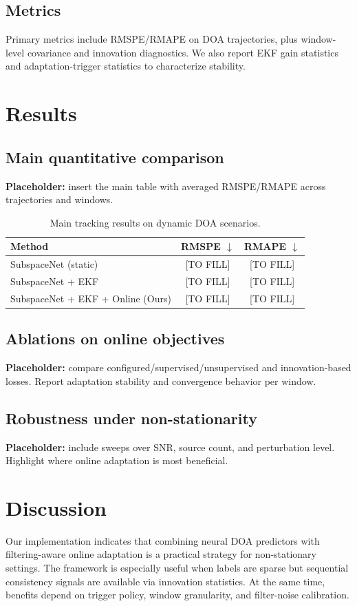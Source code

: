 \documentclass{article}
\begin{document}
\subsection{Metrics}
Primary metrics include RMSPE/RMAPE on DOA trajectories, plus window-level covariance and innovation diagnostics.
We also report EKF gain statistics and adaptation-trigger statistics to characterize stability.

\section{Results}
\subsection{Main quantitative comparison}
\textbf{Placeholder:} insert the main table with averaged RMSPE/RMAPE across trajectories and windows.

\begin{table}[t]
\caption{Main tracking results on dynamic DOA scenarios.}
\label{tab:main}
\centering
\begin{tabular}{lcc}
\toprule
Method & RMSPE $\downarrow$ & RMAPE $\downarrow$ \\
\midrule
SubspaceNet (static) & [TO FILL] & [TO FILL] \\
SubspaceNet + EKF & [TO FILL] & [TO FILL] \\
SubspaceNet + EKF + Online (Ours) & [TO FILL] & [TO FILL] \\
\bottomrule
\end{tabular}
\end{table}

\subsection{Ablations on online objectives}
\textbf{Placeholder:} compare configured/supervised/unsupervised and innovation-based losses.
Report adaptation stability and convergence behavior per window.

\subsection{Robustness under non-stationarity}
\textbf{Placeholder:} include sweeps over SNR, source count, and perturbation level.
Highlight where online adaptation is most beneficial.

\section{Discussion}
Our implementation indicates that combining neural DOA predictors with filtering-aware online adaptation is a practical strategy for non-stationary settings.
The framework is especially useful when labels are sparse but sequential consistency signals are available via innovation statistics.
At the same time, benefits depend on trigger policy, window granularity, and filter-noise calibration.
\end{document}
